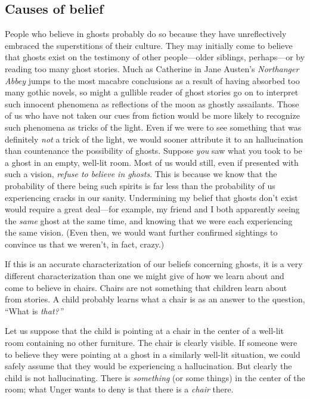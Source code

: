 \documentclass[11pt]{standalone} \newif\ifstandlone \standalonetrue
\begin{document}
\begin{spacing}{1.5}
\begin{enumerate}
\subsection{Causes of belief}
\label{unger-cause}
People who believe in ghosts probably do so because they have
unreflectively embraced the superstitions of their culture.  They may
initially come to believe that ghosts exist on the testimony of other
people---older siblings, perhaps---or by reading too many ghost
stories.  Much as Catherine in Jane Austen's {\em Northanger Abbey}
jumps to the most macabre conclusions as a result of having absorbed
too many gothic novels, so might a gullible reader of ghost stories go
on to interpret such innocent phenomena as reflections of the moon as
ghostly assailants.  Those of us who have not taken our cues from
fiction would be more likely to recognize such phenomena as tricks of
the light.  Even if we were to see something that was definitely {\em
  not} a trick of the light, we would sooner attribute it to an
hallucination than countenance the possibility of ghosts.  Suppose
{\em you} saw what you took to be a ghost in an empty, well-lit room.
Most of us would still, even if presented with such a vision, {\em
  refuse to believe in ghosts}.  This is because we know that the
probability of there being such spirits is far less than the
probability of us experiencing cracks in our sanity.  Undermining my
belief that ghosts don't exist would require a great deal---for
example, my friend and I both apparently seeing the {\em same} ghost
at the same time, and knowing that we were each experiencing the same
vision.  (Even then, we would want further confirmed sightings to
convince us that we weren't, in fact, crazy.)

If this is an accurate characterization of our beliefs concerning
ghosts, it is a very different characterization than one we might give
of how we learn about and come to believe in chairs.  Chairs are not
something that children learn about from stories.  A child probably
learns what a chair is as an answer to the question, ``What is {\em
  that?}\,''  

Let us suppose that the child is pointing at a chair in the center of
a well-lit room containing no other furniture.  The chair is clearly
visible.  If someone were to believe they were pointing at a ghost in
a similarly well-lit situation, we could safely assume that they would
be experiencing a hallucination.  But clearly the child is not
hallucinating.  There is {\em something} (or some things) in the
center of the room; what Unger wants to deny is that there is a {\em
  chair} there.


\end{enumerate}
\end{spacing}
\end{document}
